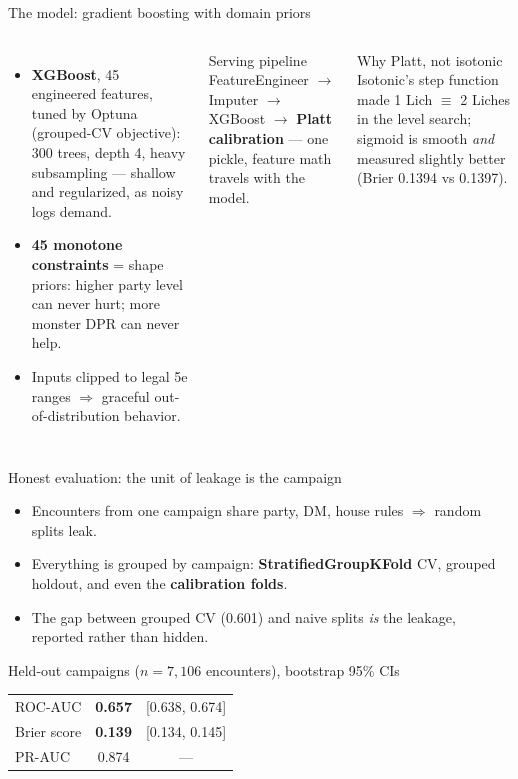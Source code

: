 \documentclass[aspectratio=169,11pt]{beamer}
\begin{document}
\begin{frame}{The model: gradient boosting with domain priors}
  \begin{columns}[T]
      \begin{itemize}
        \item \textbf{XGBoost}, 45 engineered features, tuned by Optuna (grouped-CV objective): 300 trees, depth 4, heavy subsampling — shallow and regularized, as noisy logs demand.
        \item \textbf{45 monotone constraints} = shape priors: higher party level can never hurt; more monster DPR can never help.
        \item Inputs clipped to legal 5e ranges $\Rightarrow$ graceful out-of-distribution behavior.
      \end{itemize}
      \begin{block}{Serving pipeline}
        \small FeatureEngineer $\to$ Imputer $\to$ XGBoost $\to$ \textbf{Platt calibration} — one pickle, feature math travels with the model.
      \end{block}
      \begin{exampleblock}{Why Platt, not isotonic}
        \small Isotonic's step function made 1 Lich $\equiv$ 2 Liches in the level search; sigmoid is smooth \emph{and} measured slightly better (Brier 0.1394 vs 0.1397).
      \end{exampleblock}
  \end{columns}
\end{frame}

\begin{frame}{Honest evaluation: the unit of leakage is the campaign}
  \begin{itemize}
    \item Encounters from one campaign share party, DM, house rules $\Rightarrow$ random splits leak.
    \item Everything is grouped by campaign: \textbf{StratifiedGroupKFold} CV, grouped holdout, and even the \textbf{calibration folds}.
    \item The gap between grouped CV (0.601) and naive splits \emph{is} the leakage, reported rather than hidden.
  \end{itemize}
  \begin{block}{Held-out campaigns ($n = 7{,}106$ encounters), bootstrap 95\% CIs}
    \centering
    \begin{tabular}{lcc}
      \toprule
      ROC-AUC & \textbf{0.657} & [0.638, 0.674] \\
      Brier score & \textbf{0.139} & [0.134, 0.145] \\
      PR-AUC & 0.874 & — \\
      \bottomrule
    \end{tabular}
  \end{block}
\end{frame}
\end{document}
